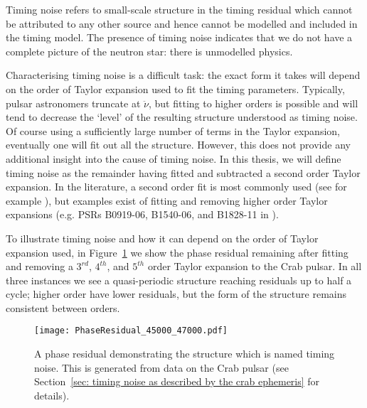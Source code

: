 Timing noise refers to small-scale structure in the timing residual which
cannot be attributed to any other source and hence cannot be modelled and
included in the timing model. The presence of timing noise indicates that we do
not have a complete picture of the neutron star: there is unmodelled physics.

Characterising timing noise is a difficult task: the exact form it takes will
depend on the order of Taylor expansion used to fit the timing parameters.
Typically, pulsar astronomers truncate at $\ddot{\nu}$, but fitting to higher
orders is possible and will tend to decrease the `level' of the resulting
structure understood as timing noise. Of course using a sufficiently large
number of terms in the Taylor expansion, eventually one will fit out all the
structure. However, this does not provide any additional insight into the cause
of timing noise. In this thesis, we will define timing noise as the remainder
having fitted and subtracted a second order Taylor expansion. In the
literature, a second order fit is most commonly used (see for example
\citet{Hobbs2010}), but examples exist of fitting and removing higher order
Taylor expansions (e.g. PSRs B0919-06, B1540-06, and B1828-11 in \citet{Lyne2010}).

To illustrate timing noise and how it can depend on the order of Taylor
expansion used, in Figure~\ref{fig: timing noise example} we show the phase
residual remaining after fitting and removing a $3^{rd}$, $4^{th}$, and
$5^{th}$ order Taylor expansion to the Crab pulsar. In all three instances we
see a quasi-periodic structure reaching residuals up to half a cycle; higher
order have lower residuals, but the form of the structure remains consistent
between orders.
\begin{figure}[htb]
\centering
\texttt{[image: PhaseResidual\_45000\_47000.pdf]}
\caption{A phase residual demonstrating the structure which is named timing
noise. This is generated from data on the Crab pulsar (see Section~\ref{sec:
timing noise as described by the crab ephemeris} for details).}
\label{fig: timing noise example}
\end{figure}

